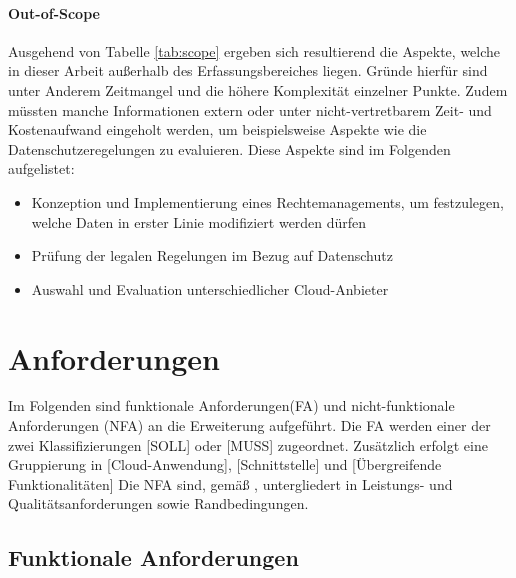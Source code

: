 \paragraph{Out-of-Scope}
Ausgehend von Tabelle \ref{tab:scope} ergeben sich resultierend die Aspekte, welche in dieser Arbeit außerhalb des Erfassungsbereiches liegen. Gründe hierfür sind unter Anderem Zeitmangel und die höhere Komplexität einzelner Punkte. Zudem müssten manche Informationen extern oder unter nicht-vertretbarem Zeit- und Kostenaufwand eingeholt werden, um beispielsweise Aspekte wie die Datenschutzeregelungen zu evaluieren. Diese Aspekte sind im Folgenden aufgelistet:

\begin{itemize}
    \item Konzeption und Implementierung eines Rechtemanagements, um festzulegen, welche Daten in erster Linie modifiziert werden dürfen
    \item Prüfung der legalen Regelungen im Bezug auf Datenschutz
    \item Auswahl und Evaluation unterschiedlicher Cloud-Anbieter
\end{itemize}
% 
% 
% 
% 
% 
% 
\section{Anforderungen}
Im Folgenden sind funktionale Anforderungen(\acs{FA}) und nicht-funktionale Anforderungen (\acs{NFA}) an die Erweiterung aufgeführt. Die \acs{FA} werden einer der zwei Klassifizierungen [SOLL] oder [MUSS] zugeordnet. 
%
Zusätzlich erfolgt eine Gruppierung in [Cloud-Anwendung], [Schnittstelle] und [Übergreifende Funktionalitäten] 
%
Die NFA sind, gemäß \citeauthor{ISO25063}, untergliedert in Leistungs- und Qualitätsanforderungen sowie Randbedingungen.
\autocite{ISO25063}

\subsection{Funktionale Anforderungen}

